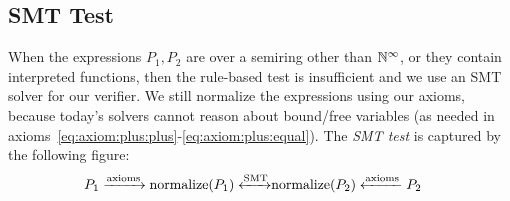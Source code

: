 \subsection{SMT Test} \label{subsubsec:smt:test} When the
expressions $P_1, P_2$ are over a semiring other than $\mathbb N^\infty$, or
they contain interpreted functions, then the rule-based test is
insufficient and we use an SMT solver for our verifier.
We still normalize the
expressions using our axioms, because today's solvers cannot reason
about bound/free variables (as needed in
axioms~\eqref{eq:axiom:plus:plus}-\eqref{eq:axiom:plus:equal}).  The
{\em SMT test} is captured by the following figure:
%
%
\begin{align}
  P_{1} \xrightarrow[]{\text{axioms}} \text{normalize}(P_{1})
  \xleftrightarrow{\text{SMT}} &
  \text{normalize}(P_{2}) \xleftarrow[]{\text{axioms}} P_{2} \label{eq:equality:smt}
\end{align}


